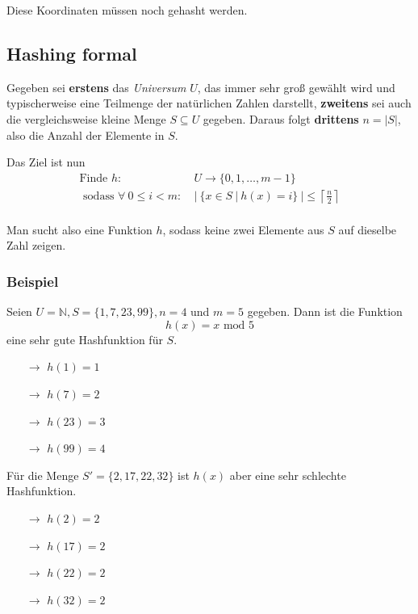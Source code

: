 \documentclass{scrartcl}%
\begin{document}
    Diese Koordinaten müssen noch gehasht werden.

    \subsection*{Hashing formal}\label{subsec:hashingFormal}
    Gegeben sei \textbf{\textsf{erstens}} das \textit{Universum} $U$, das immer sehr groß gewählt wird und
    typischerweise eine Teilmenge der natürlichen Zahlen darstellt, \textbf{\textsf{zweitens}} sei auch die vergleichsweise kleine Menge $S\subseteq U$ gegeben.
    Daraus folgt \textbf{\textsf{drittens}} $n=|S|$, also die Anzahl der Elemente in $S$.

    Das Ziel ist nun
    \begin{equation*}
        \begin{flalign}
            \text{Finde } h:&\ U \rightarrow \{0,1,\ldots,m-1\} \\\nonumber
            \text{ sodass } \forall\ 0 \leq i < m:&\ \biggl|\ \{x \in S\ |\ h(x) = i \}\ \biggl| \leq \left\lceil \frac{n}{2}\right\rceil\\\nonumber
        \end{flalign}
    \end{equation*}

    Man sucht also eine Funktion $h$, sodass keine zwei Elemente aus $S$ auf dieselbe Zahl zeigen.

    \subsubsection*{Beispiel}
    Seien $U=\mathbb{N}, S=\{1,7,23,99\}, n=4$ und $m=5$ gegeben.
    Dann ist die Funktion
    \begin{equation*}
        h(x) = x\text{ mod }5
    \end{equation*}
    eine sehr gute Hashfunktion für $S$.
    \begin{itemize}
        \itemsep0pt
        \item [$\rightarrow$] $h(1) = 1$
        \item [$\rightarrow$] $h(7) = 2$
        \item [$\rightarrow$] $h(23) = 3$
        \item [$\rightarrow$] $h(99) = 4$
    \end{itemize}
    Für die Menge $S'=\{2,17,22,32\}$ ist $h(x)$ aber eine sehr schlechte Hashfunktion.
    \begin{itemize}
        \itemsep0pt
        \item [$\rightarrow$] $h(2) = 2$
        \item [$\rightarrow$] $h(17) = 2$
        \item [$\rightarrow$] $h(22) = 2$
        \item [$\rightarrow$] $h(32) = 2$
    \end{itemize}
\end{document}
